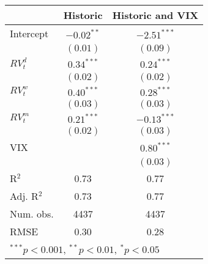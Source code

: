
\begin{tabular}{l c c }
\hline
 & Historic & Historic and VIX \\
\hline
Intercept    & $-0.02^{**}$ & $-2.51^{***}$ \\
             & $(0.01)$     & $(0.09)$      \\
$RV_{t}^{d}$ & $0.34^{***}$ & $0.24^{***}$  \\
             & $(0.02)$     & $(0.02)$      \\
$RV_{t}^{w}$ & $0.40^{***}$ & $0.28^{***}$  \\
             & $(0.03)$     & $(0.03)$      \\
$RV_{t}^{m}$ & $0.21^{***}$ & $-0.13^{***}$ \\
             & $(0.02)$     & $(0.03)$      \\
VIX          &              & $0.80^{***}$  \\
             &              & $(0.03)$      \\
\hline
R$^2$        & 0.73         & 0.77          \\
Adj. R$^2$   & 0.73         & 0.77          \\
Num. obs.    & 4437         & 4437          \\
RMSE         & 0.30         & 0.28          \\
\hline
\multicolumn{3}{l}{\scriptsize{$^{***}p<0.001$, $^{**}p<0.01$, $^*p<0.05$}}
\end{tabular}
